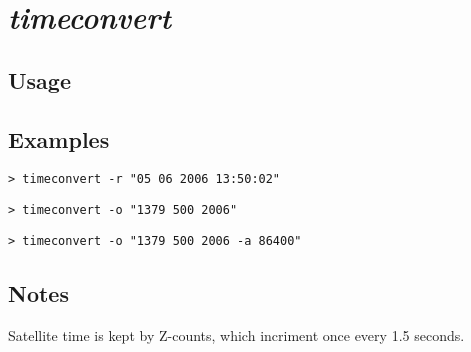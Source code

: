 \section{\emph{timeconvert}}
\subsection{Usage}
\subsection{Examples}
\begin{verbatim}
> timeconvert -r "05 06 2006 13:50:02"
\end{verbatim}
\pagebreak
\begin{verbatim}
> timeconvert -o "1379 500 2006"
\end{verbatim}
\begin{verbatim}
> timeconvert -o "1379 500 2006 -a 86400"
\end{verbatim}
\subsection{Notes}
Satellite time is kept by Z-counts, which incriment once every 1.5 seconds.

